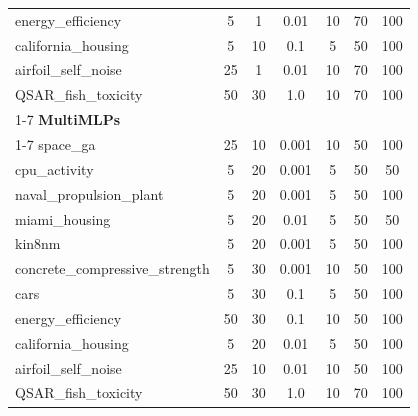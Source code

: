 \begin{table}[t]
\begin{center}
\begin{small}
\begin{sc}
{\begin{tabular}{lcccccc}
energy\_efficiency & 5 & 1 & 0.01 & 10 & 70 & 100 \\
california\_housing & 5 & 10 & 0.1 & 5 & 50 & 100 \\
airfoil\_self\_noise & 25 & 1 & 0.01 & 10 & 70 & 100 \\
QSAR\_fish\_toxicity & 50 & 30 & 1.0 & 10 & 70 & 100 \\
\cmidrule(lr){1-7}
\textbf{MultiMLPs} \\ \cmidrule(lr){1-7}
space\_ga & 25 & 10 & 0.001 & 10 & 50 & 100 \\
cpu\_activity & 5 & 20 & 0.001 & 5 & 50 & 50 \\
naval\_propulsion\_plant & 5 & 20 & 0.001 & 5 & 50 & 100 \\
miami\_housing & 5 & 20 & 0.01 & 5 & 50 & 50 \\
kin8nm & 5 & 20 & 0.001 & 5 & 50 & 100 \\
concrete\_compressive\_strength & 5 & 30 & 0.001 & 10 & 50 & 100 \\
cars & 5 & 30 & 0.1 & 5 & 50 & 100 \\
energy\_efficiency & 50 & 30 & 0.1 & 10 & 50 & 100 \\
california\_housing & 5 & 20 & 0.01 & 5 & 50 & 100 \\
airfoil\_self\_noise & 25 & 10 & 0.01 & 10 & 50 & 100 \\
QSAR\_fish\_toxicity & 50 & 30 & 1.0 & 10 & 70 & 100 \\

\bottomrule
\end{tabular}
}
\end{sc}
\end{small}
\end{center}
\end{table}
